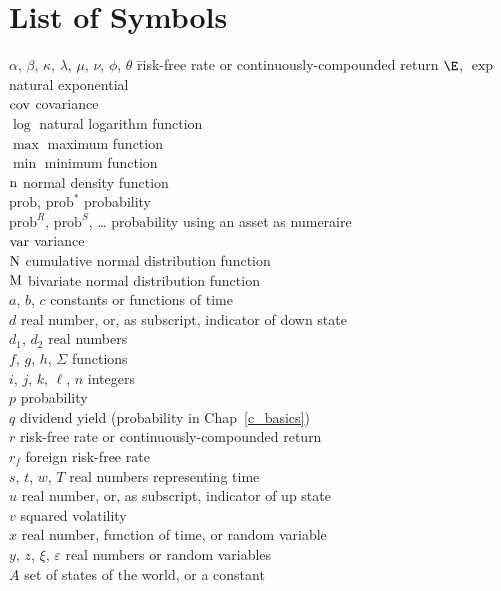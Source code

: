 \chapter*{List of Symbols}

\begin{tabbing}
$\alpha$, $\beta$, $\kappa$, $\lambda$, $\mu$, $\nu$, $\phi$, $\theta$ \qquad\= risk-free rate  or continuously-compounded return \kill
$\E$, $\exp$ \> natural exponential\\
$\operatorname{cov}$ \> covariance\\
$\log$ \> natural logarithm function\\
$\max$ \> maximum function\\
$\min$ \> minimum function\\
$\operatorname{n}$ \> normal density function\\
$\text{prob}$, $\text{prob}^*$ \> probability\\
$\text{prob}^R$, $\text{prob}^S$, \ldots \> probability using an asset as numeraire\\
$\operatorname{var}$ \> variance\\
$\operatorname{N}$ \> cumulative normal distribution function\\
$\operatorname{M}$ \> bivariate normal distribution function\\
$a$, $b$, $c$ \> constants or functions of time\\
$d$ \> real number, or, as subscript, indicator of down state\\
$d_1$, $d_2$ \> real numbers\\
$f$, $g$, $h$, $\Sigma$ \> functions\\
$i$, $j$, $k$, $\ell$, $n$ \> integers\\
$p$ \> probability\\
$q$ \> dividend yield (probability in Chap~\ref{c_basics})\\
$r$ \> risk-free rate or continuously-compounded return\\
$r_f$ \> foreign risk-free rate\\
$s$, $t$, $w$, $T$  \> real numbers representing time\\
$u$ \> real number, or, as subscript, indicator of up state\\
$v$ \> squared volatility\\
$x$ \> real number, function of time, or random variable\\
$y$, $z$, $\xi$, $\varepsilon$ \> real numbers or random variables\\
$A$ \> set of states of the world, or a constant\\

\end{tabbing}
